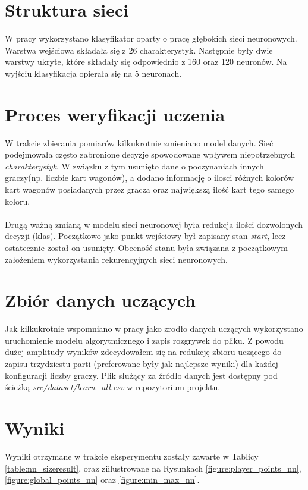 \documentclass[12pt, oneside]{report}
\begin{document}
\section{Struktura sieci}
W pracy wykorzystano klasyfikator oparty o pracę głębokich sieci neuronowych. Warstwa wejściowa składała się z 26 charakterystyk. Następnie były dwie warstwy ukryte, które składały się odpowiednio z 160 oraz 120 neuronów. Na wyjściu klasyfikacja opierała się na 5 neuronach.
\section{Proces weryfikacji uczenia}
W trakcie zbierania pomiarów kilkukrotnie zmieniano model danych. Sieć podejmowała często zabronione decyzje spowodowane wpływem niepotrzebnych \textit{charakterystyk}. W związku z tym usunięto dane o poczynaniach innych graczy(np. liczbie kart wagonów), a dodano informację o ilosci różnych kolorów kart wagonów posiadanych przez gracza oraz największą ilość kart tego samego koloru. \\ \\ 
Drugą ważną zmianą w modelu sieci neuronowej była redukcja ilości dozwolonych decyzji (klas). Początkowo jako punkt wejściowy był zapisany stan \textit{start}, lecz ostatecznie został on usunięty. Obecność stanu była związana z początkowym założeniem wykorzystania rekurencyjnych sieci neuronowych.
\section{Zbiór danych uczących}
Jak kilkukrotnie wspomniano w pracy jako zrodło danych uczących wykorzystano uruchomienie modelu algorytmicznego i zapis rozgrywek do pliku. Z powodu dużej amplitudy wyników zdecydowałem się na redukcję zbioru uczącego do zapisu trzydziestu parti (preferowane były jak najlepsze wyniki) dla każdej konfiguracji liczby graczy. Plik służący za źródło danych jest dostępny pod ścieżką \textit{src/dataset/learn\_all.csv} w repozytorium projektu.
\section{Wyniki} 
Wyniki otrzymane w trakcie eksperymentu zostały zawarte w Tablicy \ref{table:nn_sizeresult}, oraz ziilustrowane na Rysunkach \ref{figure:player_points_nn}, \ref{figure:global_points_nn} oraz \ref{figure:min_max_nn}.
\end{document}
